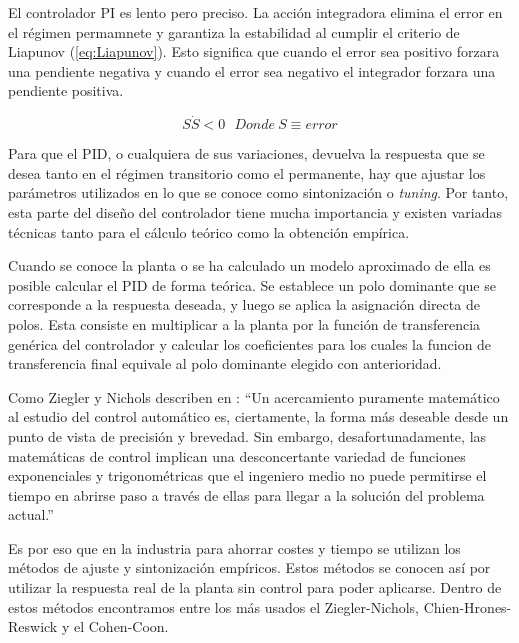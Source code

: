 \documentclass{book}
\begin{document}
El controlador PI es lento pero preciso. La acci\'on integradora elimina el error en el r\'egimen permamnete y garantiza la estabilidad al cumplir el criterio de Liapunov (\ref{eq:Liapunov}). Esto significa que cuando el error sea positivo forzara una pendiente negativa y cuando el error sea negativo el integrador forzara una pendiente positiva. \par

\begin{equation}\label{eq:Liapunov}
	S\dot S < 0 \ \ \ Donde \ S\equiv error
\end{equation} \par

Para que el PID, o cualquiera de sus variaciones, devuelva la respuesta que se desea tanto en el r\'egimen transitorio como el permanente, hay que ajustar los par\'ametros utilizados en lo que se conoce como sintonizaci\'on o \emph{tuning}. Por tanto, esta parte del diseño del controlador tiene mucha importancia y existen variadas t\'ecnicas tanto para el c\'alculo te\'orico como la obtenci\'on emp\'irica. \par

Cuando se conoce la planta o se ha calculado un modelo aproximado de ella es posible calcular el PID de forma te\'orica. Se establece un polo dominante que se corresponde a la respuesta deseada, y luego se aplica la asignaci\'on directa de polos. Esta consiste en multiplicar a la planta por la funci\'on de transferencia gen\'erica del controlador y calcular los coeficientes para los cuales la funcion de transferencia final equivale al polo dominante elegido con anterioridad. \par

Como Ziegler y Nichols describen en \cite{ZNoriginal}: ``Un acercamiento puramente matem\'atico al estudio del control autom\'atico es, ciertamente, la forma más deseable desde un punto de vista de precisi\'on y brevedad. Sin embargo, desafortunadamente, las matem\'aticas de control implican una desconcertante variedad de funciones exponenciales y trigonom\'etricas que el ingeniero medio no puede permitirse el tiempo en abrirse paso a trav\'es de ellas para llegar a la soluci\'on del problema actual.'' \par

Es por eso que en la industria para ahorrar costes y tiempo se utilizan los m\'etodos de ajuste y sintonizaci\'on emp\'iricos. Estos m\'etodos se conocen as\'i por utilizar la respuesta real de la planta sin control para poder aplicarse. Dentro de estos m\'etodos encontramos entre los m\'as usados el Ziegler-Nichols, Chien-Hrones-Reswick y el Cohen-Coon.\par
\end{document}

